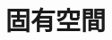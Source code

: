 \documentclass[../../../topic_linear-algebra]{subfiles}
\begin{document}
\sectionline
\section{固有空間}
\end{document}
